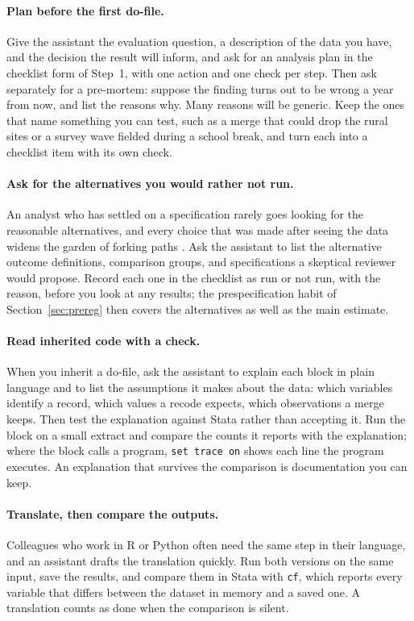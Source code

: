 \paragraph{Plan before the first do-file.} Give the assistant the evaluation question, a description of the data you have, and the decision the result will inform, and ask for an analysis plan in the checklist form of Step~1, with one action and one check per step. Then ask separately for a pre-mortem: suppose the finding turns out to be wrong a year from now, and list the reasons why. Many reasons will be generic. Keep the ones that name something you can test, such as a merge that could drop the rural sites or a survey wave fielded during a school break, and turn each into a checklist item with its own check.

\paragraph{Ask for the alternatives you would rather not run.} An analyst who has settled on a specification rarely goes looking for the reasonable alternatives, and every choice that was made after seeing the data widens the garden of forking paths \parencite{gelman2013forking}. Ask the assistant to list the alternative outcome definitions, comparison groups, and specifications a skeptical reviewer would propose. Record each one in the checklist as run or not run, with the reason, before you look at any results; the prespecification habit of Section~\ref{sec:prereg} then covers the alternatives as well as the main estimate.

\paragraph{Read inherited code with a check.} When you inherit a do-file, ask the assistant to explain each block in plain language and to list the assumptions it makes about the data: which variables identify a record, which values a recode expects, which observations a merge keeps. Then test the explanation against Stata rather than accepting it. Run the block on a small extract and compare the counts it reports with the explanation; where the block calls a program, \texttt{set trace on} shows each line the program executes. An explanation that survives the comparison is documentation you can keep.

\paragraph{Translate, then compare the outputs.} Colleagues who work in R or Python often need the same step in their language, and an assistant drafts the translation quickly. Run both versions on the same input, save the results, and compare them in Stata with \texttt{cf}, which reports every variable that differs between the dataset in memory and a saved one. A translation counts as done when the comparison is silent.

